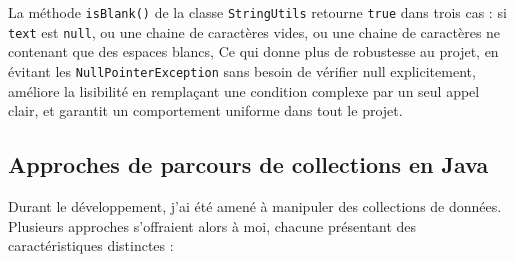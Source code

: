 \documentclass[12pt,a4paper]{report}
\begin{document}
	La méthode \verb|isBlank()| de la classe \verb|StringUtils| retourne \verb|true| dans trois cas : si \verb|text| est \verb|null|, ou une chaine de caractères vides, ou une chaine de caractères ne contenant que des espaces blancs, Ce qui donne plus de robustesse au projet, en évitant les \verb|NullPointerException| sans besoin de vérifier null explicitement, améliore la lisibilité en remplaçant une condition complexe par un seul appel clair, et garantit un comportement uniforme dans tout le projet.
	
	\subsection{Approches de parcours de collections en Java}
	
	Durant le développement, j'ai été amené à manipuler des collections de données. Plusieurs approches s'offraient alors à moi, chacune présentant des caractéristiques distinctes :
	
\end{document}
